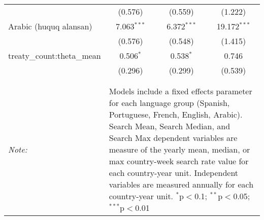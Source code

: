 \begin{table}[!htbp]
\begin{tabular}{@{\extracolsep{5pt}}lccc}
  & (0.576) & (0.559) & (1.222) \\ 
  Arabic (huquq alansan) & 7.063$^{***}$ & 6.372$^{***}$ & 19.172$^{***}$ \\ 
  & (0.576) & (0.548) & (1.415) \\ 
  treaty\_count:theta\_mean & 0.506$^{*}$ & 0.538$^{*}$ & 0.746 \\ 
  & (0.296) & (0.299) & (0.539) \\ 
 \hline \\[-1.8ex] 
\hline 
\hline \\[-1.8ex] 
\textit{Note:}  & \multicolumn{3}{l}{\parbox[t]{8cm}{Models include a fixed effects parameter for each language group (Spanish, Portuguese, French, English, Arabic). Search Mean, Search Median, and Search Max dependent variables are measure of the yearly mean, median, or max country-week search rate value for each country-year unit. Independent variables are measured annually for each country-year unit. $^{*}$p$<$0.1; $^{**}$p$<$0.05; $^{***}$p$<$0.01}} \\ 
\end{tabular} 
\end{table} 
